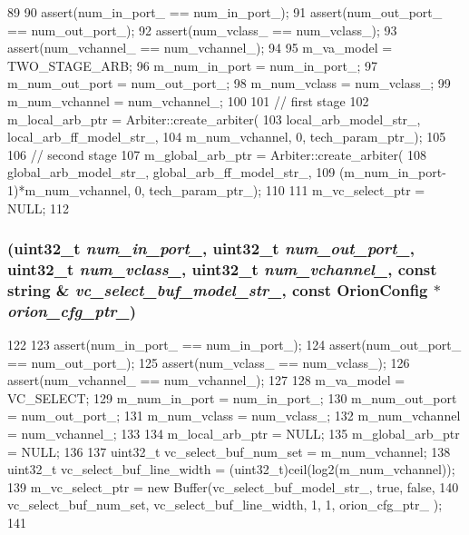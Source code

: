\begin{DoxyCode}
89 {
90     assert(num_in_port_ == num_in_port_);
91     assert(num_out_port_ == num_out_port_);
92     assert(num_vclass_ == num_vclass_);
93     assert(num_vchannel_ == num_vchannel_);
94 
95     m_va_model = TWO_STAGE_ARB;
96     m_num_in_port = num_in_port_;
97     m_num_out_port = num_out_port_;
98     m_num_vclass = num_vclass_;
99     m_num_vchannel = num_vchannel_;
100 
101     // first stage
102     m_local_arb_ptr = Arbiter::create_arbiter(
103             local_arb_model_str_, local_arb_ff_model_str_,
104             m_num_vchannel, 0, tech_param_ptr_);
105 
106     // second stage
107     m_global_arb_ptr = Arbiter::create_arbiter(
108             global_arb_model_str_, global_arb_ff_model_str_,
109             (m_num_in_port-1)*m_num_vchannel, 0, tech_param_ptr_);
110 
111     m_vc_select_ptr = NULL;
112 }
\end{DoxyCode}
\hypertarget{classVCAllocator_a0b2080a0d054daf29949a238a93fe76e}{
\subsubsection[{VCAllocator}]{ ({\bf uint32\_\-t} {\em num\_\-in\_\-port\_\-}, \/  {\bf uint32\_\-t} {\em num\_\-out\_\-port\_\-}, \/  {\bf uint32\_\-t} {\em num\_\-vclass\_\-}, \/  {\bf uint32\_\-t} {\em num\_\-vchannel\_\-}, \/  const string \& {\em vc\_\-select\_\-buf\_\-model\_\-str\_\-}, \/  const {\bf OrionConfig} $\ast$ {\em orion\_\-cfg\_\-ptr\_\-})}}
\label{classVCAllocator_a0b2080a0d054daf29949a238a93fe76e}



\begin{DoxyCode}
122 {
123     assert(num_in_port_ == num_in_port_);
124     assert(num_out_port_ == num_out_port_);
125     assert(num_vclass_ == num_vclass_);
126     assert(num_vchannel_ == num_vchannel_);
127 
128     m_va_model = VC_SELECT;
129     m_num_in_port = num_in_port_;
130     m_num_out_port = num_out_port_;
131     m_num_vclass = num_vclass_;
132     m_num_vchannel = num_vchannel_;
133 
134     m_local_arb_ptr = NULL;
135     m_global_arb_ptr = NULL;
136 
137     uint32_t vc_select_buf_num_set = m_num_vchannel;
138     uint32_t vc_select_buf_line_width = (uint32_t)ceil(log2(m_num_vchannel));
139     m_vc_select_ptr = new Buffer(vc_select_buf_model_str_, true, false, 
140             vc_select_buf_num_set, vc_select_buf_line_width, 1, 1, orion_cfg_ptr_
      );
141 }
\end{DoxyCode}



